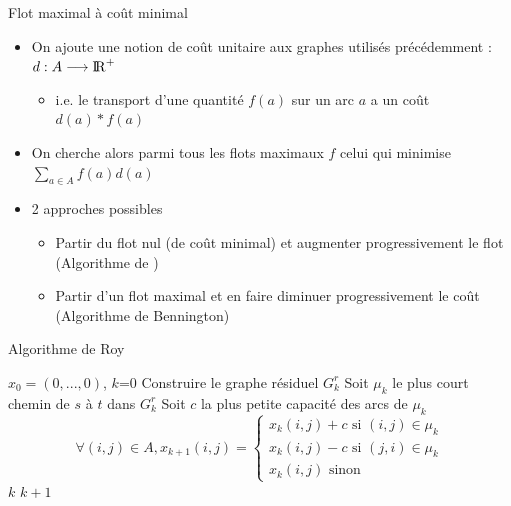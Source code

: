 \begin{frame}{Flot maximal à coût minimal}
    \begin{itemize}
        \item On ajoute une notion de coût unitaire aux graphes utilisés précédemment : $d : A \longrightarrow \mathrm{I\! R}^+$
        \begin{itemize}
            \item i.e. le transport d'une quantité $f(a)$ sur un arc $a$ a un coût $d(a)*f(a)$ 
        \end{itemize}
        \item On cherche alors parmi tous les flots maximaux $f$ celui qui minimise $\sum_{a \in A} f(a)d(a)$
        \item 2 approches possibles 
        \begin{itemize}
            \item Partir du flot nul (de coût minimal) et augmenter progressivement le flot (Algorithme de \Roy)
            \item Partir d'un flot maximal et en faire diminuer progressivement le coût (Algorithme de Bennington)
        \end{itemize}
    \end{itemize}
\end{frame}


\begin{frame}{Algorithme de Roy}
\label{alg:roy}
\begin{algorithmic}
    \State $x_0 = (0,...,0)$, $k$=0 
    \State Construire le graphe résiduel $G_k^r$
        \State Soit $\mu_k$ le plus court chemin de $s$ à $t$ dans $G_k^r$
        \State Soit $c$ la plus petite capacité des arcs de $\mu_k$ 
        \State $$\forall (i,j) \in A, x_{k+1}(i,j) = \left\{ 
            \begin{array}{l}
                x_k(i,j)+c \textrm{ si } (i,j) \in \mu_k \\
                x_k(i,j)-c \textrm{ si } (j,i) \in \mu_k \\
                x_k(i,j) \textrm{ sinon}
            \end{array}
            \right. $$
        \State $k$ \gets $k+1$
    \EndWhile
\end{algorithmic}
\end{frame}



